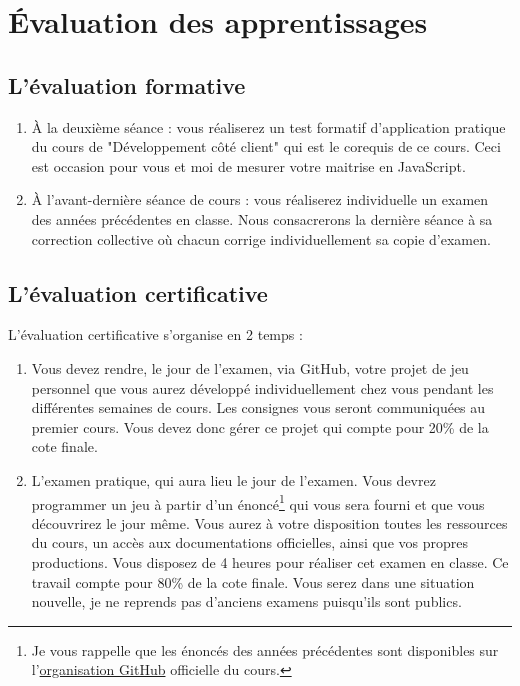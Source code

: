 \section{Évaluation des apprentissages}
\subsection{L’évaluation formative}
\label{eval_formative}
\begin{enumerate}
    \item À la deuxième séance : vous réaliserez un test formatif d’application pratique du cours de "Développement côté client" qui est le corequis de ce cours. Ceci est occasion pour vous et moi de mesurer votre maitrise en JavaScript.
    \item À l'avant-dernière séance de cours : vous réaliserez individuelle un examen des années précédentes en classe. Nous consacrerons la dernière séance à sa correction collective où chacun corrige individuellement sa copie d'examen.
\end{enumerate}

\subsection{L’évaluation certificative}

L’évaluation certificative s'organise en 2 temps :
\begin{enumerate}
    \item Vous devez rendre, le jour de l'examen, via GitHub, votre projet de jeu personnel que vous aurez développé individuellement chez vous pendant les différentes semaines de cours. Les consignes vous seront communiquées au premier cours. Vous devez donc gérer ce projet qui compte pour 20\% de la cote finale.
    \item L'examen pratique, qui aura lieu le jour de l'examen. Vous devrez programmer un jeu à partir d'un énoncé\footnote{Je vous rappelle que les énoncés des années précédentes sont disponibles sur l'\href{https://github.com/tecg-mmi}{organisation GitHub} officielle du cours.} qui vous sera fourni et que vous découvrirez le jour même. Vous aurez à votre disposition toutes les ressources du cours, un accès aux documentations officielles, ainsi que vos propres productions. Vous disposez de 4 heures pour réaliser cet examen en classe. Ce travail compte pour 80\% de la cote finale. Vous serez dans une situation nouvelle, je ne reprends pas d'anciens examens puisqu'ils sont publics.
\end{enumerate}


